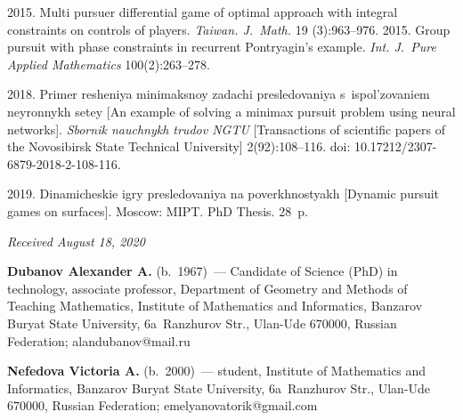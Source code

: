 \begin{multicols}{2}
{{\begin{thebibliography}{99}
 2015. Multi pursuer 
differential game of optimal approach with integral constraints on controls of players. 
\textit{Taiwan. J.~Math.} 19 (3):963--976.
 2015. Group pursuit with phase constraints in 
recurrent Pontryagin's example. \textit{Int. J.~Pure Applied Mathematics} 100(2):263--278.

\pagebreak 

 2018. Primer resheniya mi\-ni\-maks\-noy zadachi presledovaniya 
s~ispol'zovaniem ney\-ron\-nykh se\-tey [An example of solving a minimax pursuit problem using 
neural networks]. \textit{Sbornik nauchnykh trudov NGTU} [Transactions of scientific papers of the Novosibirsk State 
Technical University] 2(92):108--116. doi: 10.17212/2307-6879-2018-2-108-116.

\vspace*{-2pt}

 2019. Dinamicheskie igry presledovaniya na poverkhnostyakh 
[Dynamic pursuit games on surfaces].  Moscow: MIPT.  PhD Thesis. 28~p.
\end{thebibliography}

 }
 }

\end{multicols}

\vspace*{-6pt}

\hfill{\small\textit{Received August 18, 2020}}

\Contr


\noindent
\textbf{Dubanov Alexander A.} (b.\ 1967)~--- Candidate of Science (PhD) in technology, 
associate professor, Department of Geometry and Methods of Teaching Mathematics, 
Institute of Mathematics and Informatics, Banzarov Buryat State University, 6a~Ranzhurov 
Str., Ulan-Ude 670000, Russian Federation; \mbox{alandubanov@mail.ru}

\vspace*{3pt}

\noindent
\textbf{Nefedova Victoria A.} (b.\ 2000)~--- student, Institute of Mathematics and 
Informatics, Banzarov Buryat State University, 6a~Ranzhurov Str., Ulan-Ude 670000, 
Russian Federation; \mbox{emelyanovatorik@gmail.com}



\label{end\stat}

\renewcommand{\bibname}{\protect\rm Литература}    